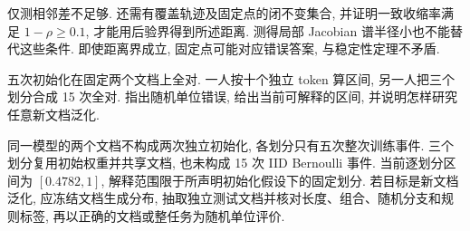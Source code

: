 \begin{solution}
仅测相邻差不足够. 还需有覆盖轨迹及固定点的闭不变集合, 并证明一致收缩率满足 $1-\rho\ge0.1$, 才能用后验界得到所述距离. 测得局部 Jacobian 谱半径小也不能替代这些条件. 即使距离界成立, 固定点可能对应错误答案, 与稳定性定理不矛盾.
\end{solution}
\begin{exercise}
五次初始化在固定两个文档上全对. 一人按十个独立 token 算区间, 另一人把三个划分合成 15 次全对. 指出随机单位错误, 给出当前可解释的区间, 并说明怎样研究任意新文档泛化.
\end{exercise}
\begin{solution}
同一模型的两个文档不构成两次独立初始化, 各划分只有五次整次训练事件. 三个划分复用初始权重并共享文档, 也未构成 15 次 IID Bernoulli 事件. 当前逐划分区间为 $[0.4782,1]$, 解释范围限于所声明初始化假设下的固定划分. 若目标是新文档泛化, 应冻结文档生成分布, 抽取独立测试文档并核对长度、组合、随机分支和规则标签, 再以正确的文档或整任务为随机单位评价.
\end{solution}
\label{ch:end:13}
